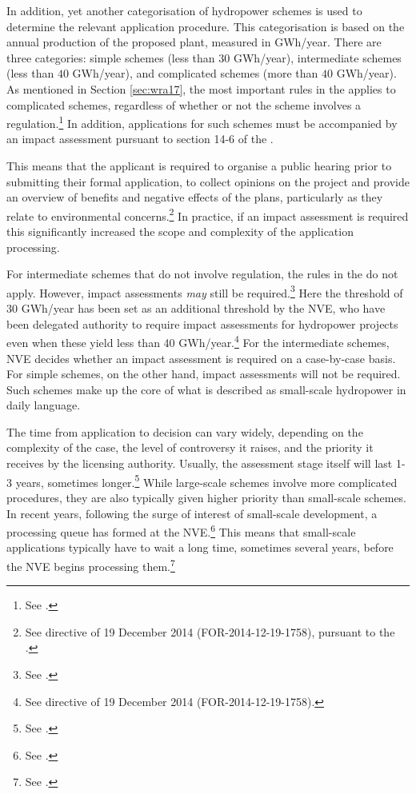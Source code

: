 In addition, yet another categorisation of hydropower schemes is used to determine the relevant application procedure. This categorisation is based on the annual production of the proposed plant, measured in GWh/year. There are three categories: simple schemes (less than $30$ GWh/year), intermediate schemes (less than $40$ GWh/year), and complicated schemes (more than $40$ GWh/year). As mentioned in Section \ref{sec:wra17}, the most important rules in the \cite{wra17} applies to complicated schemes, regardless of whether or not the scheme involves a regulation.\footnote{See \cite[19]{wra00}.} In addition, applications for such schemes must be accompanied by an impact assessment pursuant to section 14-6 of the \cite{pb08}.

This means that the applicant is required to organise a public hearing prior to submitting their formal application, to collect opinions on the project and provide an overview of benefits and negative effects of the plans, particularly as they relate to environmental concerns.\footnote{See directive of 19 December 2014 (FOR-2014-12-19-1758), pursuant to the \cite[1-2,14-6]{pb08}.} In practice, if an impact assessment is required this significantly increased the scope and complexity of the application processing.

For intermediate schemes that do not involve regulation, the rules in the \cite{wra17} do not apply. However, impact assessments {\it may} still be required.\footnote{See \cite[20]{stokker10}.} Here the threshold of 30 GWh/year has been set as an additional threshold by the NVE, who have been delegated authority to require impact assessments for hydropower projects even when these yield less than 40 GWh/year.\footnote{See directive of 19 December 2014 (FOR-2014-12-19-1758).} For the intermediate schemes, NVE decides whether an impact assessment is required on a case-by-case basis. For simple schemes, on the other hand, impact assessments will not be required. Such schemes make up the core of what is described as small-scale hydropower in daily language.

The time from application to decision can vary widely, depending on the complexity of the case, the level of controversy it raises, and the priority it receives by the licensing authority. Usually, the assessment stage itself will last 1-3 years, sometimes longer.\footnote{See \cite[84-85]{nou129}.} While large-scale schemes involve more complicated procedures, they are also typically given higher priority than small-scale schemes. In recent years, following the surge of interest of small-scale development, a processing queue has formed at the NVE.\footnote{See \cite[84]{nou129}.} This means that small-scale applications typically have to wait a long time, sometimes several years, before the NVE begins processing them.\footnote{See \cite[84]{nou129}.}

